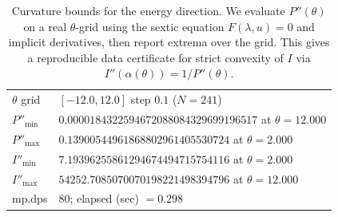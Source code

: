 \begin{table}[H]
\centering
\scriptsize
\setlength{\tabcolsep}{6pt}
\caption{Curvature bounds for the energy direction. We evaluate $P''(\theta)$ on a real $\theta$-grid using the sextic equation $F(\lambda,u)=0$ and implicit derivatives, then report extrema over the grid. This gives a reproducible data certificate for strict convexity of $I$ via $I''(\alpha(\theta))=1/P''(\theta)$.}
\label{tab:sync_kernel_rate_curve_curvature_bounds}
\begin{tabular}{l l}
\toprule
$\theta$ grid & $[-12.0,12.0]$ step $0.1$ ($N=241$)\\
$P''_{\min}$ & $0.0000184322594672088084329699196517$ at $\theta=12.000$\\
$P''_{\max}$ & $0.13900544961868802961405530724$ at $\theta=2.000$\\
$I''_{\min}$ & $7.19396255861294674494715754116$ at $\theta=2.000$\\
$I''_{\max}$ & $54252.7085070070198221498394796$ at $\theta=12.000$\\
mp.dps & $80$; elapsed (sec) $=0.298$\\
\bottomrule
\end{tabular}
\end{table}
